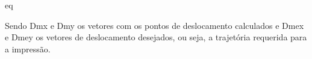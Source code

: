 eq

Sendo Dmx e Dmy os vetores com os pontos de deslocamento 
calculados e Dmex e Dmey os vetores de deslocamento desejados, 
ou seja, a trajetória requerida para a impressão.

















